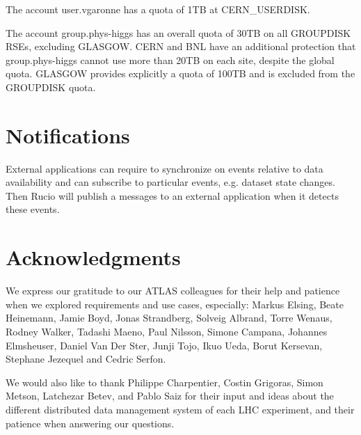 \documentclass{atlasnote}
\begin{document}
\medskip

The account user.vgaronne has a quota of 1TB at CERN\_USERDISK.

The account group.phys-higgs has an overall quota of 30TB on all GROUPDISK RSEs, excluding GLASGOW. CERN and BNL have an additional protection
that group.phys-higgs cannot use more than 20TB on each site, despite the global quota. GLASGOW provides explicitly
a quota of 100TB and is excluded from the GROUPDISK quota.

\section{Notifications}
\label{overview_Notifications:notifications}\label{overview_Notifications::doc}

External applications can require to synchronize on events relative to data availability and can subscribe to particular events, e.g. dataset state changes. Then Rucio will publish a messages to an external application when it detects these events.

\section*{Acknowledgments}
\label{Acknowledgments::doc}\label{Acknowledgments:acknowledgments}
We express our gratitude to our ATLAS colleagues for their help and
patience when we explored requirements and use cases, especially:
Markus Elsing, Beate Heinemann, Jamie Boyd, Jonas Strandberg, Solveig Albrand, Torre Wenaus, Rodney
Walker, Tadashi Maeno, Paul Nilsson, Simone Campana, Johannes
Elmsheuser, Daniel Van Der Ster, Junji Tojo, Ikuo Ueda, Borut
Kersevan, Stephane Jezequel and Cedric Serfon.


We would also like to thank Philippe Charpentier, Costin Grigoras,
Simon Metson, Latchezar Betev, and Pablo Saiz for their input and
ideas about the different distributed data management system of each
LHC experiment, and their patience when answering our questions.

\newpage

\label{rucio:appendices}
\end{document}
